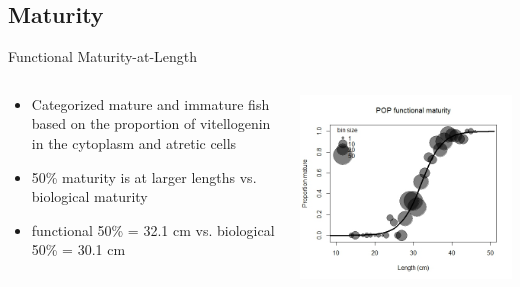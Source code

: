 \documentclass[pdf]{beamer}\usepackage[]{graphicx}\usepackage[]{color}
\begin{document}
\subsection{Maturity}
\begin{frame}{Functional Maturity-at-Length}
\begin{columns}
  \begin{column}{0.55\textwidth}
      \begin{itemize}
        \item Categorized mature and immature fish based on the proportion of vitellogenin in the cytoplasm and atretic cells
        \item 50\% maturity is at larger lengths vs. biological maturity
        \item functional 50\% = 32.1 cm vs. biological 50\% = 30.1 cm
      \end{itemize}
  \end{column}
  
  \begin{column}{0.45\textwidth}
  \begin{center}
    \includegraphics[scale = 0.40]{figures/Functional_Maturity.png}
  \end{center}
  \end{column}
\end{columns}
\end{frame}
\end{document}
